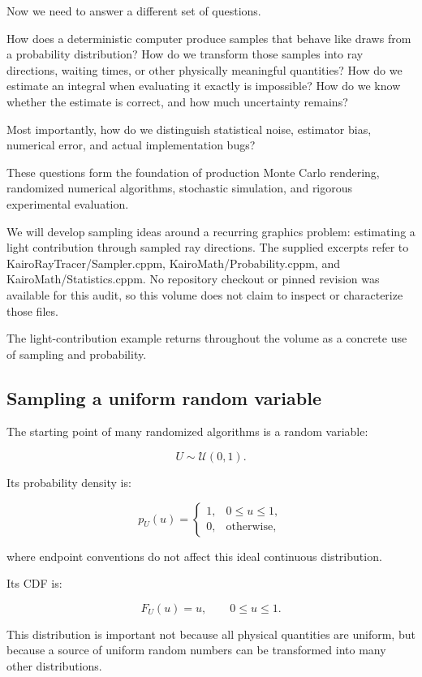 Now we need to answer a different set of questions.

How does a deterministic computer produce samples that behave like draws from a probability distribution? How do we transform those samples into ray directions, waiting times, or other physically meaningful quantities? How do we estimate an integral when evaluating it exactly is impossible? How do we know whether the estimate is correct, and how much uncertainty remains?

Most importantly, how do we distinguish statistical noise, estimator bias, numerical error, and actual implementation bugs?

These questions form the foundation of production Monte Carlo rendering, randomized numerical algorithms, stochastic simulation, and rigorous experimental evaluation.

We will develop sampling ideas around a recurring graphics problem: estimating a light contribution through sampled ray directions. The supplied excerpts refer to KairoRayTracer/Sampler.cppm, KairoMath/Probability.cppm, and KairoMath/Statistics.cppm. No repository checkout or pinned revision was available for this audit, so this volume does not claim to inspect or characterize those files.

The light-contribution example returns throughout the volume as a concrete use of sampling and probability.

\subsection{Sampling a uniform random variable}\label{02-foundations-ii-ch029-sampling-a-uniform-random-variable}

The starting point of many randomized algorithms is a random variable:

\[
 U\sim\mathcal U(0,1).
\]

Its probability density is:

\[
 p_U(u)= \begin{cases} 1,&0\le u\le1,\\ 0,&\text{otherwise}, \end{cases}
\]

where endpoint conventions do not affect this ideal continuous distribution.

Its CDF is:

\[
 F_U(u)=u,\qquad 0\le u\le1.
\]

This distribution is important not because all physical quantities are uniform, but because a source of uniform random numbers can be transformed into many other distributions.

